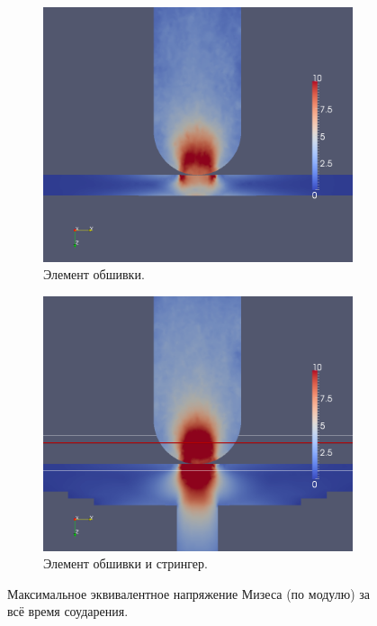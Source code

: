 \begin{figure}[htp]
\begin{subfigure}[b]{0.5\textwidth}
\centering
\includegraphics[width=\textwidth]{png/pkm-experiment/wing-only/mises.png}
\caption{Элемент обшивки.}
\end{subfigure}
\begin{subfigure}[b]{0.5\textwidth}
\centering
\includegraphics[width=\textwidth]{png/pkm-experiment/wing-stringer/mises.png}
\caption{Элемент обшивки и стрингер.}
\end{subfigure}
\caption{Максимальное эквивалентное напряжение Мизеса (по модулю) за всё время соударения.}
\label{pic:pkm_experiment_mises}
\end{figure}

